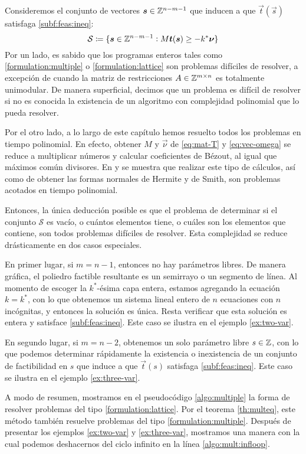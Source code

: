 Consideremos el conjunto de vectores $\boldsymbol{s} \in \mathbb{Z}^{n-m-1}$ que inducen a que $\vec{t}(\vec{s})$
satisfaga \eqref{subf:feas:ineq}:
\begin{equation*}
	\mathcal{S} \coloneq \lbrace \boldsymbol{s} \in \mathbb{Z}^{n-m-1} \vcentcolon M\boldsymbol{t}(\boldsymbol{s}) \geq -k^*\boldsymbol{\nu} \rbrace
\end{equation*}
Por un lado, es sabido que los programas enteros tales como \eqref{formulation:multiple} o
\eqref{formulation:lattice} son problemas difíciles de resolver, a excepción de cuando la matriz de
restricciones $A \in \mathbb{Z}^{m \times n}$ es totalmente unimodular. De manera superficial, decimos que
un problema es difícil de resolver si no es conocida la existencia de un algoritmo con complejidad
polinomial que lo pueda resolver.

Por el otro lado, a lo largo de este capítulo hemos resuelto todos los problemas en tiempo
polinomial. En efecto, obtener $M$ y $\vec{\nu}$ de \eqref{eq:mat-T} y \eqref{eq:vec-omega} se
reduce a multiplicar números y calcular coeficientes de Bézout, al igual que máximos común
divisores. En \cite{alex} y \cite{morris} se muestra que realizar este tipo de cálculos, así como de
obtener las formas normales de Hermite y de Smith, son problemas acotados en tiempo polinomial.

Entonces, la única deducción posible es que el problema de determinar si el conjunto $\mathcal{S}$
es vacío, o cuántos elementos tiene, o cuáles son los elementos que contiene, son todos problemas
difíciles de resolver. Esta complejidad se reduce drásticamente en dos casos especiales.

En primer lugar, si $m = n - 1$, entonces no hay parámetros libres. De manera gráfica, el poliedro
factible resultante es un semirrayo o un segmento de línea. Al momento de escoger la $k^*$-ésima
capa entera, estamos agregando la ecuación $k = k^*$, con lo que obtenemos un sistema lineal entero
de $n$ ecuaciones con $n$ incógnitas, y entonces la solución es única. Resta verificar que esta
solución es entera y satisface \eqref{subf:feas:ineq}. Este caso se ilustra en el ejemplo
\ref{ex:two-var}.

En segundo lugar, si $m = n - 2$, obtenemos un solo parámetro libre $s \in \mathbb{Z}$, con lo que podemos
determinar rápidamente la existencia o inexistencia de un conjunto de factibilidad en $s$ que induce
a que $\vec{t}(s)$ satisfaga \eqref{subf:feas:ineq}. Este caso se ilustra en el ejemplo
\ref{ex:three-var}.

A modo de resumen, mostramos en el pseudocódigo \ref{algo:multiple} la forma de resolver problemas
del tipo \eqref{formulation:lattice}. Por el teorema \ref{th:multeq}, este método también resuelve
problemas del tipo \eqref{formulation:multiple}. Después de presentar los ejemplos \ref{ex:two-var}
y \ref{ex:three-var}, mostramos una manera con la cual podemos deshacernos del ciclo infinito en la
línea \ref{algo:mult:infloop}.

